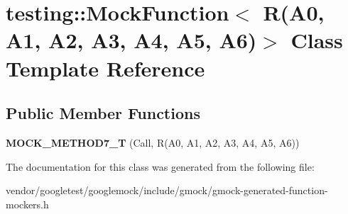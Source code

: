 \hypertarget{classtesting_1_1MockFunction_3_01R_07A0_00_01A1_00_01A2_00_01A3_00_01A4_00_01A5_00_01A6_08_4}{}\section{testing\+:\+:Mock\+Function$<$ R(A0, A1, A2, A3, A4, A5, A6)$>$ Class Template Reference}
\label{classtesting_1_1MockFunction_3_01R_07A0_00_01A1_00_01A2_00_01A3_00_01A4_00_01A5_00_01A6_08_4}
\subsection*{Public Member Functions}
\begin{DoxyCompactItemize}
\item 
{\bfseries M\+O\+C\+K\+\_\+\+M\+E\+T\+H\+O\+D7\+\_\+T} (Call, R(A0, A1, A2, A3, A4, A5, A6))\hypertarget{classtesting_1_1MockFunction_3_01R_07A0_00_01A1_00_01A2_00_01A3_00_01A4_00_01A5_00_01A6_08_4_a965d96b3e212c5bd0391302fcee943d6}{}\label{classtesting_1_1MockFunction_3_01R_07A0_00_01A1_00_01A2_00_01A3_00_01A4_00_01A5_00_01A6_08_4_a965d96b3e212c5bd0391302fcee943d6}

\end{DoxyCompactItemize}


The documentation for this class was generated from the following file\+:\begin{DoxyCompactItemize}
\item 
vendor/googletest/googlemock/include/gmock/gmock-\/generated-\/function-\/mockers.\+h\end{DoxyCompactItemize}

